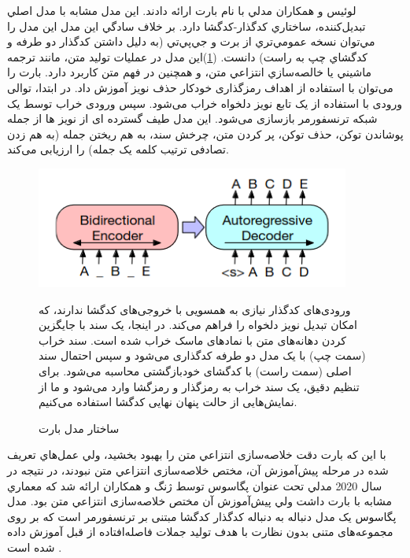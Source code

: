 لوئيس و همكاران مدلي با نام بارت 
 ارائه دادند. اين مدل مشابه با مدل اصلي تبديل‌كننده، ساختاري كدگذار-كدگشا دارد. بر خلاف سادگي اين مدل اين مدل را مي‌توان نسخه عمومي‌تري از برت و جي‌پي‌تي 
 (به دليل داشتن كدگذار دو طرفه و كدگشاي چپ به راست) دانست. (\ref{fig:bart})اين مدل در عمليات توليد متن، مانند ترجمه ماشيني يا خالصه‌سازي انتزاعي متن، و همچنين در فهم متن كاربرد دارد. بارت را می‌توان با استفاده از اهداف رمزگذاری خودکار حذف نویز آموزش داد. در ابتدا، توالی ورودی با استفاده از یک تابع نویز دلخواه خراب می‌شود. سپس ورودی خراب توسط یک شبکه ترنسفورمر بازسازی می‌شود. این مدل طیف گسترده ای از نویز  ها از جمله پوشاندن توکن، حذف توکن، پر کردن متن، چرخش سند، به هم ریختن جمله (به هم زدن تصادفی ترتیب کلمه یک جمله) را ارزیابی می‌کند\cite{liu2020survey,lewis-etal-2020-bart}. 
 \begin{figure}[!h]
 	\begin{center}
 		\includegraphics[height=4cm]{bart.png}
 	\end{center}
 	\caption{ ساختار مدل بارت \cite{lewis-etal-2020-bart}}
 	\label{fig:bart}
 	\medskip
 	\small
 	ورودی‌های کدگذار نیازی به همسویی با خروجی‌های کدگشا ندارند، که امکان تبدیل نویز دلخواه را فراهم می‌کند. در اینجا، یک سند با جایگزین کردن دهانه‌های متن با نمادهای ماسک خراب شده است. سند خراب (سمت چپ) با یک مدل دو طرفه کدگذاری می‌شود و سپس احتمال سند اصلی (سمت راست) با کدگشای خودبازگشتی محاسبه می‌شود. برای تنظیم دقیق، یک سند خراب به رمزگذار و رمزگشا وارد می‌شود و ما از نمایش‌هایی از حالت پنهان‌ نهایی کدگشا استفاده می‌کنیم\cite{lewis-etal-2020-bart}.
 \end{figure}
 
 
با اين كه بارت دقت خلاصه‌سازی انتزاعي متن را بهبود بخشيد، ولي عمل‌هاي تعریف شده در مرحله پيش‌آموزش آن، مختص خلاصه‌سازی انتزاعي متن نبودند، در نتیجه در سال 2020 مدلي تحت عنوان پگاسوس  
 توسط ژنگ و همكاران ارائه شد كه معماري مشابه با بارت داشت ولي پيش‌آموزش آن مختص خلاصه‌سازی انتزاعي متن بود.
 مدل پگاسوس
یک مدل دنباله به دنباله کدگذار کدگشا مبتنی بر ترنسفورمر است که بر روی مجموعه‌های متنی بدون نظارت با هدف تولید جملات فاصله‌افتاده
از قبل آموزش داده شده است
\cite{zhang2020pegasus}.

